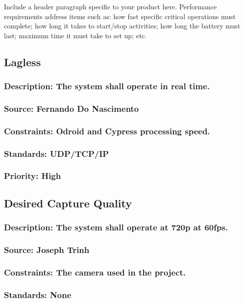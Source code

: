 Include a header paragraph specific to your product here. Performance requirements address items such as: how fast specific critical operations must complete; how long it takes to start/stop activities; how long the battery must last; maximum time it must take to set up; etc.

\subsection{Lagless}
\subsubsection{Description: The system shall operate in real time.}
\subsubsection{Source: Fernando Do Nascimento}
\subsubsection{Constraints: Odroid and Cypress processing speed.}
\subsubsection{Standards: UDP/TCP/IP}
\subsubsection{Priority: High}

\subsection{Desired Capture Quality}
\subsubsection{Description: The system shall operate at 720p at 60fps.}
\subsubsection{Source: Joseph Trinh}
\subsubsection{Constraints: The camera used in the project.}
\subsubsection{Standards: None}

